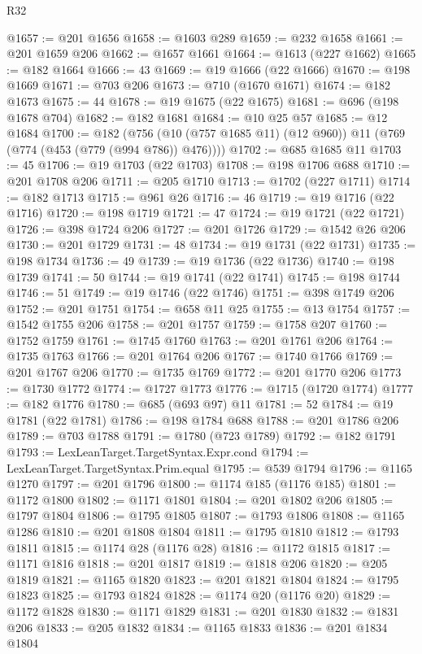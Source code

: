 \begin{lexlean}{R32}
\begin{coremodule}
@1657 := @201 @1656
@1658 := @1603 @289
@1659 := @232 @1658
@1661 := @201 @1659 @206
@1662 := @1657 @1661
@1664 := @1613 (@227 @1662)
@1665 := @182 @1664
@1666 := 43
@1669 := @19 @1666 (@22 @1666)
@1670 := @198 @1669
@1671 := @703 @206
@1673 := @710 (@1670 @1671)
@1674 := @182 @1673
@1675 := 44
@1678 := @19 @1675 (@22 @1675)
@1681 := @696 (@198 @1678 @704)
@1682 := @182 @1681
@1684 := @10 @25 @57
@1685 := @12 @1684
@1700 := @182
    (@756 (@10 (@757 @1685 @11) (@12 @960)) @11 (@769 (@774 (@453 (@779 (@994 @786)) @476))))
@1702 := @685 @1685 @11
@1703 := 45
@1706 := @19 @1703 (@22 @1703)
@1708 := @198 @1706 @688
@1710 := @201 @1708 @206
@1711 := @205 @1710
@1713 := @1702 (@227 @1711)
@1714 := @182 @1713
@1715 := @961 @26
@1716 := 46
@1719 := @19 @1716 (@22 @1716)
@1720 := @198 @1719
@1721 := 47
@1724 := @19 @1721 (@22 @1721)
@1726 := @398 @1724 @206
@1727 := @201 @1726
@1729 := @1542 @26 @206
@1730 := @201 @1729
@1731 := 48
@1734 := @19 @1731 (@22 @1731)
@1735 := @198 @1734
@1736 := 49
@1739 := @19 @1736 (@22 @1736)
@1740 := @198 @1739
@1741 := 50
@1744 := @19 @1741 (@22 @1741)
@1745 := @198 @1744
@1746 := 51
@1749 := @19 @1746 (@22 @1746)
@1751 := @398 @1749 @206
@1752 := @201 @1751
@1754 := @658 @11 @25
@1755 := @13 @1754
@1757 := @1542 @1755 @206
@1758 := @201 @1757
@1759 := @1758 @207
@1760 := @1752 @1759
@1761 := @1745 @1760
@1763 := @201 @1761 @206
@1764 := @1735 @1763
@1766 := @201 @1764 @206
@1767 := @1740 @1766
@1769 := @201 @1767 @206
@1770 := @1735 @1769
@1772 := @201 @1770 @206
@1773 := @1730 @1772
@1774 := @1727 @1773
@1776 := @1715 (@1720 @1774)
@1777 := @182 @1776
@1780 := @685 (@693 @97) @11
@1781 := 52
@1784 := @19 @1781 (@22 @1781)
@1786 := @198 @1784 @688
@1788 := @201 @1786 @206
@1789 := @703 @1788
@1791 := @1780 (@723 @1789)
@1792 := @182 @1791
@1793 := LexLeanTarget.TargetSyntax.Expr.cond
@1794 := LexLeanTarget.TargetSyntax.Prim.equal
@1795 := @539 @1794
@1796 := @1165 @1270
@1797 := @201 @1796
@1800 := @1174 @185 (@1176 @185)
@1801 := @1172 @1800
@1802 := @1171 @1801
@1804 := @201 @1802 @206
@1805 := @1797 @1804
@1806 := @1795 @1805
@1807 := @1793 @1806
@1808 := @1165 @1286
@1810 := @201 @1808 @1804
@1811 := @1795 @1810
@1812 := @1793 @1811
@1815 := @1174 @28 (@1176 @28)
@1816 := @1172 @1815
@1817 := @1171 @1816
@1818 := @201 @1817
@1819 := @1818 @206
@1820 := @205 @1819
@1821 := @1165 @1820
@1823 := @201 @1821 @1804
@1824 := @1795 @1823
@1825 := @1793 @1824
@1828 := @1174 @20 (@1176 @20)
@1829 := @1172 @1828
@1830 := @1171 @1829
@1831 := @201 @1830
@1832 := @1831 @206
@1833 := @205 @1832
@1834 := @1165 @1833
@1836 := @201 @1834 @1804

\end{coremodule}
\end{lexlean}
